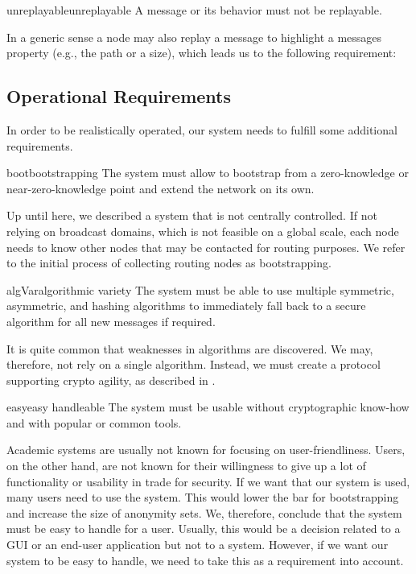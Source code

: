 \begin{requirement}{unreplayable}{unreplayable}
	A message or its behavior must not be replayable.
\end{requirement}

In a generic sense a node may also replay a message to highlight a messages property (e.g., the path or a size), which leads us to the following requirement:

\subsection{Operational Requirements}
In order to be realistically operated, our system needs to fulfill some additional requirements.

\begin{requirement}{boot}{bootstrapping}
	The system must allow to bootstrap from a zero-knowledge or near-zero-knowledge point and extend the network on its own. 
\end{requirement}
Up until here, we described a system that is not centrally controlled. If not relying on broadcast domains, which is not feasible on a global scale, each node needs to know other nodes that may be contacted for routing purposes. We refer to the initial process of collecting routing nodes as bootstrapping.

\begin{requirement}{algVar}{algorithmic variety}
	The system must be able to use multiple symmetric, asymmetric, and hashing algorithms to immediately fall back to a secure algorithm for all new messages if required. 
\end{requirement}

It is quite common that weaknesses in algorithms are discovered. We may, therefore, not rely on a single algorithm. Instead, we must create a protocol supporting crypto agility, as described in \cite{bsiPostQuantum}.

\begin{requirement}{easy}{easy handleable}
	The system must be usable without cryptographic know-how and with popular or common tools.
\end{requirement}

Academic systems are usually not known for focusing on user-friendliness. Users, on the other hand, are not known for their willingness to give up a lot of functionality or usability in trade for security. If we want that our system is used, many users need to use the system. This would lower the bar for bootstrapping and increase the size of anonymity sets. We, therefore, conclude that the system must be easy to handle for a user. Usually, this would be a decision related to a GUI or an end-user application but not to a system. However, if we want our system to be easy to handle, we need to take this as a requirement into account.


